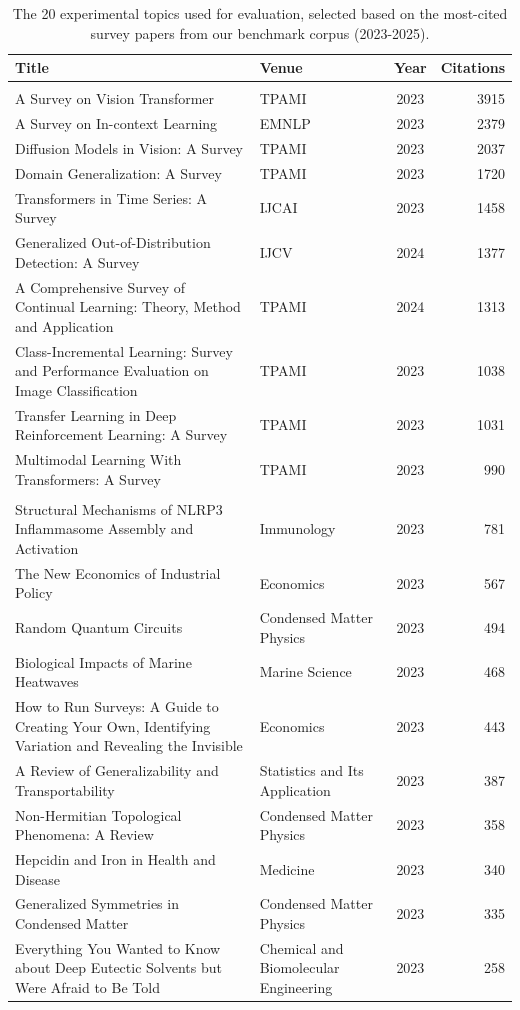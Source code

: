 \documentclass[11pt]{article}
\begin{document}
\begin{table}[h!]
\centering
\caption{The 20 experimental topics used for evaluation, selected based on the most-cited survey papers from our benchmark corpus (2023-2025).}
\label{tab:experimental_topics}
\footnotesize
\begin{tabularx}{\textwidth}{>{\raggedright\arraybackslash}X l c r}
\toprule
\textbf{Title} & \textbf{Venue} & \textbf{Year} & \textbf{Citations} \\
\midrule
\multicolumn{4}{c}{\textit{Computer Science Domain}} \\
\midrule
A Survey on Vision Transformer & TPAMI & 2023 & 3915 \\
A Survey on In-context Learning & EMNLP & 2023 & 2379 \\
Diffusion Models in Vision: A Survey & TPAMI & 2023 & 2037 \\
Domain Generalization: A Survey & TPAMI & 2023 & 1720 \\
Transformers in Time Series: A Survey & IJCAI & 2023 & 1458 \\
Generalized Out-of-Distribution Detection: A Survey & IJCV & 2024 & 1377 \\
A Comprehensive Survey of Continual Learning: Theory, Method and Application & TPAMI & 2024 & 1313 \\
Class-Incremental Learning: Survey and Performance Evaluation on Image Classification & TPAMI & 2023 & 1038 \\
Transfer Learning in Deep Reinforcement Learning: A Survey & TPAMI & 2023 & 1031 \\
Multimodal Learning With Transformers: A Survey & TPAMI & 2023 & 990 \\
\midrule
\multicolumn{4}{c}{\textit{General Science Domain}} \\
\midrule
Structural Mechanisms of NLRP3 Inflammasome Assembly and Activation & Immunology & 2023 & 781 \\
The New Economics of Industrial Policy & Economics & 2023 & 567 \\
Random Quantum Circuits & Condensed Matter Physics & 2023 & 494 \\
Biological Impacts of Marine Heatwaves & Marine Science & 2023 & 468 \\
How to Run Surveys: A Guide to Creating Your Own, Identifying Variation and Revealing the Invisible & Economics & 2023 & 443 \\
A Review of Generalizability and Transportability & Statistics and Its Application & 2023 & 387 \\
Non-Hermitian Topological Phenomena: A Review & Condensed Matter Physics & 2023 & 358 \\
Hepcidin and Iron in Health and Disease & Medicine & 2023 & 340 \\
Generalized Symmetries in Condensed Matter & Condensed Matter Physics & 2023 & 335 \\
Everything You Wanted to Know about Deep Eutectic Solvents but Were Afraid to Be Told & Chemical and Biomolecular Engineering & 2023 & 258 \\
\bottomrule
\end{tabularx}
\end{table}
\end{document}
